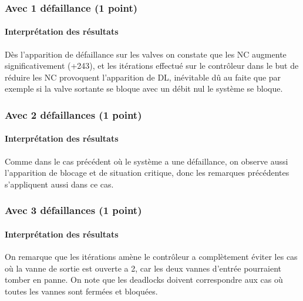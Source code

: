 \documentclass[a4paper]{book}
\begin{document}
\subsubsection{Avec 1 défaillance (1 point)}


%
%
%
\paragraph{Interprétation des résultats}
Dès l'apparition de défaillance sur les valves on constate que les NC augmente significativement (+243), et les itérations effectué sur le contrôleur dans le but de réduire les NC provoquent l'apparition de DL, inévitable dû au faite que par exemple si la valve sortante se bloque avec un débit nul le système se bloque.\

\subsubsection{Avec 2 défaillances (1 point)}


%
%
%
\paragraph{Interprétation des résultats}
Comme dans le cas précédent où le système a une défaillance, on observe aussi l’apparition de blocage et de situation critique, donc les remarques précédentes s’appliquent aussi dans ce cas.\
\newpage

\subsubsection{Avec 3 défaillances (1 point)}


%
%
%
\paragraph{Interprétation des résultats}
On remarque que les itérations amène le contrôleur a complètement éviter les cas où la vanne de sortie est ouverte a 2, car les deux vannes d'entrée pourraient tomber en panne. On note que les deadlocks doivent correspondre aux cas où toutes les vannes sont fermées et bloquées.\
\end{document}
